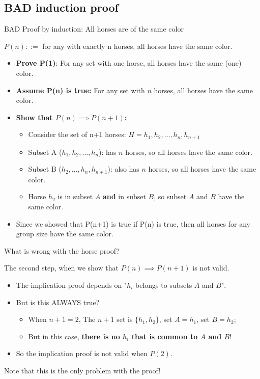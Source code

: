 \subsection{BAD induction proof}

\begin{frame}[t]{BAD Proof by induction: All horses are of the same color}

  $P(n) ::=$ for any  with \alert{exactly n horses}, all horses have the same color.\bigskip

  \begin{itemize}

  \item<2-> {\bf Prove P(1)}: For any set with one horse, all horses have the same (one) color.

  \item<3-> {\bf Assume P(n) is true:} For any set with $n$ horses, all horses have the same color.
  \item<4-> {\bf Show that $P(n) \implies P(n+1)$:}
    \begin{itemize}
    \item <5->Consider the set of n+1 horses: $H = h_1, h_2, \ldots, h_n, h_{n+1}$
    \item <6->Subset A ($h_1, h_2, \ldots, h_n$): has $n$ horses, so all horses have the same color.
    \item <7->Subset B ($h_2, \ldots, h_n, h_{n+1}$): \alert{also} has $n$ horses, so all horses have the same color.
    \item <8->Horse $h_2$ is in subset $A$ {\bf and} in subset $B$, so subset $A$ and $B$ have the same color.
    \end{itemize}
  \item<9-> Since we showed that P(n+1) is true if P(n) is true, then all horses for any group size have the same color.
  \end{itemize}\bigskip

\end{frame}

\begin{frame}{What is wrong with the horse proof?}

  The second step, when we show that $P(n) \implies P(n+1)$ is not valid.\bigskip

  \begin{itemize}
    \item The implication proof depends on "$h_i$ belongs to subsets $A$ and $B$".
    \item But is this ALWAYS true?
    \begin{itemize}
      \item When $n+1 = 2$, The $n+1$ set is $\{h_1, h_2\}$, set $A = h_1$, set $B = h_2$;
      \item But in this case, {\bf there is no $h_i$ that is common to $A$ and $B$}!
    \end{itemize}
    \item So the implication proof is not valid when $P(2)$.
  \end{itemize}\bigskip

  Note that this is the only problem with the proof!
\end{frame}

